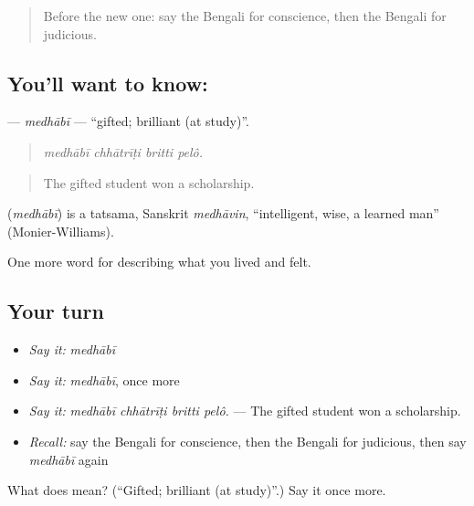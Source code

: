 \begin{quote}
Before the new one: say the Bengali for conscience, then the Bengali for judicious.
\end{quote}

\subsection*{You'll want to know: }
\textbf{} — \emph{medhābī} — \textquotedblleft{}gifted; brilliant (at study)\textquotedblright{}.

\begin{quote}
   
\end{quote}

\begin{quote}
\emph{medhābī chhātrīṭi britti pelô.}
\end{quote}

\begin{quote}
The gifted student won a scholarship.
\end{quote}

\begin{cousinweb}
\textbf{} (\emph{medhābī}) is a tatsama, Sanskrit \emph{medhāvin}, \textquotedblleft{}intelligent, wise, a learned man\textquotedblright{} (Monier-Williams).
\end{cousinweb}

\begin{grammarlens}[title={What you've built}]
One more word for describing what you lived and felt.
\end{grammarlens}

\subsection*{Your turn}
\begin{itemize}
\raggedright
  \item \emph{Say it:} \emph{medhābī}
  \item \emph{Say it:} \emph{medhābī}, once more
  \item \emph{Say it:} \emph{medhābī chhātrīṭi britti pelô.} — The gifted student won a scholarship.
  \item \emph{Recall:} say the Bengali for conscience, then the Bengali for judicious, then say \emph{medhābī} again
\end{itemize}

\begin{tcolorbox}[breakable,colback=teal!4,colframe=teal!35!black,title={Before you move on}]
What does  mean? (\textquotedblleft{}Gifted; brilliant (at study)\textquotedblright{}.) Say it once more.
\end{tcolorbox}
